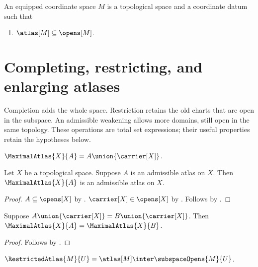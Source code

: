 \begin{struct}\label{equipped_coordinate_space}
    An equipped coordinate space $M$ is a topological space and a coordinate datum
    such that
    \begin{enumerate}
        \item\label{equipped_atlas_open} $\atlas[M]\subseteq\opens[M]$.
    \end{enumerate}
\end{struct}

\section{Completing, restricting, and enlarging atlases}

Completion adds the whole space. Restriction retains the old charts that are
open in the subspace. An admissible weakening allows more domains, still open
in the same topology. These operations are total set expressions; their useful
properties retain the hypotheses below.

\begin{definition}\label{maximal_atlas}
    $\MaximalAtlas{X}{A}=A\union\{\carrier[X]\}$.
\end{definition}

\begin{proposition}\label{maximal_atlas_admissible}
    Let $X$ be a topological space.
    Suppose $A$ is an admissible atlas on $X$.
    Then $\MaximalAtlas{X}{A}$ is an admissible atlas on $X$.
\end{proposition}
\begin{proof}
    $A\subseteq\opens[X]$ by .
    $\carrier[X]\in\opens[X]$ by .
    Follows by .
\end{proof}

\begin{proposition}\label{maximal_atlas_equal}
    Suppose $A\union\{\carrier[X]\}=B\union\{\carrier[X]\}$.
    Then $\MaximalAtlas{X}{A}=\MaximalAtlas{X}{B}$.
\end{proposition}
\begin{proof}
    Follows by .
\end{proof}

\begin{definition}\label{restricted_atlas}
    $\RestrictedAtlas{M}{U}=\atlas[M]\inter\subspaceOpens{M}{U}$.
\end{definition}

